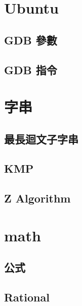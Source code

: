 
\section{Ubuntu}
%         
%         
    \subsection{GDB 參數}
        
    \subsection{GDB 指令}
        
\clearpage

\section{字串}
    \subsection{最長迴文子字串}
        
    \subsection{KMP}
        
    \subsection{Z Algorithm}
        
\clearpage

\section{math}
    \subsection{公式}
        
    \subsection{Rational}
         \columnbreak
